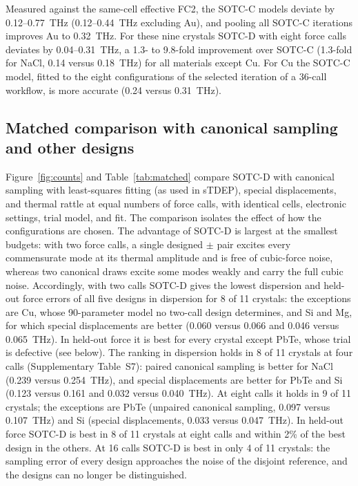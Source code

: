 \documentclass[aip,jap,reprint,amsmath,amssymb,floatfix]{revtex4-2}
\begin{document}
Measured against the same-cell effective FC2, the SOTC-C models
deviate by 0.12--0.77~THz (0.12--0.44~THz excluding Au), and pooling all
SOTC-C iterations improves Au to 0.32~THz. For these nine crystals SOTC-D
with eight force calls deviates by 0.04--0.31~THz, a 1.3- to 9.8-fold
improvement over SOTC-C (1.3-fold for NaCl, 0.14 versus 0.18~THz) for
all materials except Cu. For Cu the SOTC-C model, fitted to the eight
configurations of the selected iteration of a 36-call workflow, is more
accurate (0.24 versus 0.31~THz).



\subsection{Matched comparison with canonical sampling and other designs}\label{sec:matched}

Figure~\ref{fig:counts} and Table~\ref{tab:matched} compare SOTC-D with
canonical sampling with least-squares fitting (as used in sTDEP), special
displacements, and thermal rattle at equal numbers of force calls, with
identical cells, electronic settings, trial model, and fit. The comparison
isolates the effect of how the configurations are chosen. The advantage of
SOTC-D is largest at the smallest budgets: with two force calls, a single
designed $\pm$ pair excites every commensurate mode at its thermal amplitude
and is free of cubic-force noise, whereas two canonical draws excite some
modes weakly and carry the full cubic noise. Accordingly, with two calls
SOTC-D gives the lowest dispersion and held-out force errors of all five
designs in dispersion for 8 of 11 crystals: the exceptions are Cu, whose
90-parameter model no two-call design determines, and Si and Mg, for which
special displacements are better (0.060 versus 0.066 and 0.046 versus
0.065~THz). In held-out force it is best for every crystal except PbTe,
whose trial is defective (see below). The ranking in dispersion holds in 8
of 11 crystals at four calls (Supplementary Table~S7): paired canonical
sampling is better for NaCl (0.239 versus 0.254~THz), and special
displacements are better for PbTe and Si (0.123 versus 0.161 and 0.032
versus 0.040~THz). At eight calls it holds in 9 of 11 crystals; the
exceptions are PbTe (unpaired canonical sampling, 0.097 versus 0.107~THz)
and Si (special displacements, 0.033 versus 0.047~THz). In held-out force
SOTC-D is best in 8 of 11 crystals at eight calls and within 2\% of the best
design in the others. At 16 calls SOTC-D is best in only 4 of 11 crystals: the sampling
error of every design approaches the noise of the disjoint reference, and
the designs can no longer be distinguished.
\end{document}
